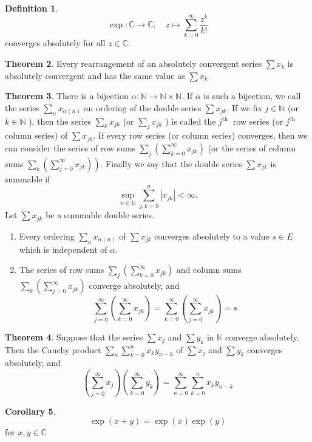 \documentclass[12pt,a4paper]{book}
\newcommand{\bb}[1]{\mathbb{#1}}
\newenvironment{enu}{\begin{enumerate}[(1)]}{\end{enumerate}}
\theoremstyle{definition}
\newtheorem{defn}{Definition}[section]
\newtheorem{coro}[defn]{Corollary}
\newtheorem{theo}[defn]{Theorem}
\begin{document}
\begin{defn}
$$
    \exp : \mathbb{C} \rightarrow \mathbb{C}, \quad z \mapsto \sum_{k=0}^{\infty} \frac{z^k}{k !}
$$
converges absolutely for all $z\in \bb{C}$.
\end{defn}
\begin{theo}
    Every rearrangement of an absolutely convergent series $\sum x_k$ is absolutely convergent and has the same value as $\sum x_k$.
\end{theo}
\begin{theo}
    There is a bijection $\alpha: \mathbb{N} \rightarrow \mathbb{N} \times \mathbb{N}$. If $\alpha$ is such a bijection, we call the series $\sum_n x_{\alpha(n)}$ an ordering of the double series $\sum x_{j k}$. If we fix $j \in \mathbb{N}$ (or $k \in \mathbb{N}$ ), then the series $\sum_k x_{j k}$ (or $\sum_j x_{j k}$ ) is called the $j^{\text {th }}$ row series (or $j^{\text {th }}$ column series) of $\sum x_{j k}$. If every row series (or column series) converges, then we can consider the series of row sums $\sum_j\left(\sum_{k=0}^{\infty} x_{j k}\right)$ (or the series of column sums $\left.\sum_k\left(\sum_{j=0}^{\infty} x_{j k}\right)\right)$. Finally we say that the double series $\sum x_{j k}$ is summable if
    $$
        \sup _{n \in \mathbb{N}} \sum_{j, k=0}^n\left|x_{j k}\right|<\infty .
    $$
    Let $\sum x_{j k}$ be a summable double series.
    \begin{enu}
        \item  Every ordering $\sum_n x_{\alpha(n)}$ of $\sum x_{j k}$ converges absolutely to a value $s \in E$ which is independent of $\alpha$.
        \item The series of row sums $\sum_j\left(\sum_{k=0}^{\infty} x_{j k}\right)$ and column sums $\sum_k\left(\sum_{j=0}^{\infty} x_{j k}\right)$ converge absolutely, and
        $$
            \sum_{j=0}^{\infty}\left(\sum_{k=0}^{\infty} x_{j k}\right)=\sum_{k=0}^{\infty}\left(\sum_{j=0}^{\infty} x_{j k}\right)=s
        $$
    \end{enu}
\end{theo}
\begin{theo}
    Suppose that the series $\sum x_j$ and $\sum y_k$ in $\mathbb{K}$ converge absolutely. Then the Cauchy product $\sum_n \sum_{k=0}^n x_k y_{n-k}$ of $\sum x_j$ and $\sum y_k$ converges absolutely, and
    $$
        \left(\sum_{j=0}^{\infty} x_j\right)\left(\sum_{k=0}^{\infty} y_k\right)=\sum_{n=0}^{\infty} \sum_{k=0}^n x_k y_{n-k}
    $$
\end{theo}
\begin{coro}
    $$\exp(x+y)=\exp(x)\exp(y) $$ for $x,y\in \bb{C}$
\end{coro}
\end{document}
